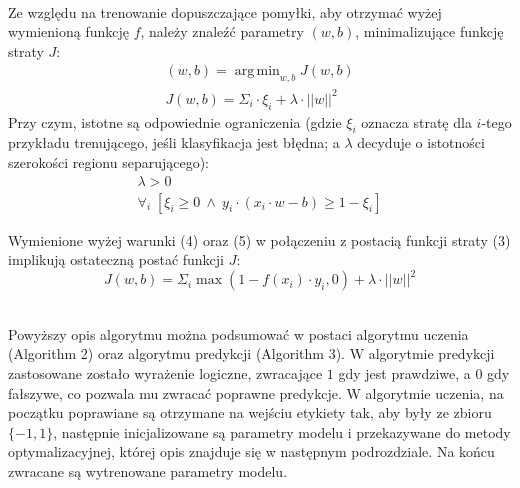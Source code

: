 \documentclass[
    left=2.5cm,         %
    right=2.5cm,        %
    top=2.5cm,          %
    bottom=3cm,         %
    bindingoffset=6mm,  %
    nohyphenation=false %
]{eiti/eiti-report}
\DeclareMathOperator{\argmin}{arg\,min}
\begin{document}
\\
Ze względu na trenowanie dopuszczające pomyłki, aby otrzymać wyżej wymienioną funkcję $f$, należy znaleźć parametry $(w,b)$, minimalizujące funkcję straty $J$:
\begin{align}
    (w,b)=\argmin_{w,b} J(w,b)\\
    J(w,b)=\Sigma_i\cdot \xi_i + \lambda\cdot ||w||^2
\end{align}
\newpage
Przy czym, istotne są odpowiednie ograniczenia (gdzie $\xi_i$ oznacza stratę dla $i$-tego przykładu trenującego, jeśli klasyfikacja jest błędna; a $\lambda$ decyduje o istotności szerokości regionu separującego):
\begin{align}
    \lambda > 0 \\
    \forall_i \;[ \xi_i \ge 0 \:\land\: y_i\cdot(x_i\cdot w-b) \ge 1-\xi_i ]
\end{align}

Wymienione wyżej warunki (4) oraz (5) w połączeniu z postacią funkcji straty (3) implikują ostateczną postać funkcji $J$:
\begin{equation}
    J(w,b)=\Sigma_i\max(1-f(x_i)\cdot y_i, 0) + \lambda\cdot||w||^2
\end{equation}

\\
Powyższy opis algorytmu można podsumować w postaci algorytmu uczenia (Algorithm 2) oraz algorytmu predykcji (Algorithm 3). W algorytmie predykcji zastosowane zostało wyrażenie logiczne, zwracające $1$ gdy jest prawdziwe, a $0$ gdy fałszywe, co pozwala mu zwracać poprawne predykcje. W algorytmie uczenia, na początku poprawiane są otrzymane na wejściu etykiety tak, aby były ze zbioru $\{-1,1\}$, następnie inicjalizowane są parametry modelu i przekazywane do metody optymalizacyjnej, której opis znajduje się w następnym podrozdziale. Na końcu zwracane są wytrenowane parametry modelu. 
\end{document}
